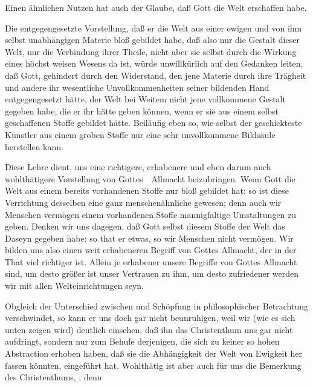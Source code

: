 \begin{aufza}
\begin{aufzb}
\end{aufzb}
\item Einen ähnlichen Nutzen hat auch der Glaube, daß Gott die Welt  erschaffen habe.
\begin{aufzb}
\item Die entgegengesetzte Vorstellung, daß er die Welt aus einer ewigen und von ihm selbst unabhängigen Materie bloß gebildet habe, daß also nur die Gestalt dieser Welt, nur die Verbindung ihrer Theile, nicht aber sie selbst durch die Wirkung eines höchst weisen Wesens da ist, würde unwillkürlich auf den Gedanken leiten, daß Gott, gehindert durch den Widerstand, den jene Materie durch ihre Trägheit und andere ihr wesentliche Unvollkommenheiten seiner bildenden Hand entgegengesetzt hätte, der Welt bei Weitem nicht jene vollkommene Gestalt gegeben habe, die er ihr hätte geben können, wenn er sie aus einem selbst geschaffenen Stoffe gebildet hätte. Beiläufig eben so, wie selbst der geschickteste Künstler aus einem groben Stoffe nur eine sehr unvollkommene Bildsäule herstellen kann.
\item Diese Lehre dient, uns eine richtigere, erhabenere und eben darum auch wohlthätigere Vorstellung von Gottes~\ Allmacht beizubringen. Wenn Gott die Welt aus einem bereits vorhandenen Stoffe nur bloß gebildet hat: so ist diese Verrichtung desselben eine ganz menschenähnliche gewesen; denn auch wir Menschen vermögen einem vorhandenen Stoffe mannigfaltige Umstaltungen zu geben. Denken wir uns dagegen, daß Gott selbst diesem Stoffe der Welt das Daseyn gegeben habe: so that er etwas, so wir Menschen nicht vermögen. Wir bilden uns also einen weit erhabeneren Begriff von Gottes Allmacht, der in der That viel richtiger ist. Allein je erhabener unsere Begriffe von Gottes Allmacht sind, um desto größer ist unser Vertrauen zu ihm, um desto zufriedener werden wir mit allen Welteinrichtungen seyn.
\end{aufzb}
\item Obgleich der Unterschied zwischen  und Schöpfung in philosophischer Betrachtung verschwindet, so kann er uns doch gar nicht beunruhigen, weil wir (wie es sich unten zeigen wird) deutlich einsehen, daß ihn das Christenthum uns gar nicht aufdringt, sondern nur zum Behufe derjenigen, die sich zu keiner so hohen Abstraction erhoben haben, daß sie die Abhängigkeit der Welt von Ewigkeit her fassen könnten, eingeführt hat. Wohlthätig ist aber auch für uns die Bemerkung des Christenthums, ; denn

\end{aufza}
